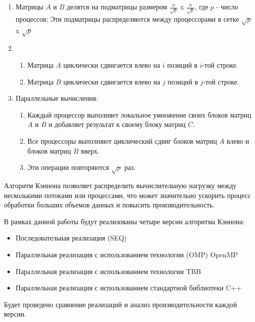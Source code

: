 \documentclass{report}
\begin{document}
\begin{enumerate}
\item Матрицы $A$ и $B$ делятся на подматрицы размером $\frac{n}{\sqrt{p}}$ x $\frac{n}{\sqrt{p}}$, где $p$ - число процессов;
Эти подматрицы распределяются между процессорами в сетке $\sqrt{p}$ x $\sqrt{p}$
\item 
\begin{enumerate}
\item Матрица $A$ циклически сдвигается влево на $i$ позиций в $i$-той строке.
\item Матрица $B$ циклически сдвигается влево на $j$ позиций в $j$-той строке.
\end{enumerate}
\item Параллельные вычисления:
\begin{enumerate}
\item Каждый процессор выполняет локальное умножение своих блоков матриц $A$ и $B$ и добавляет результат к своему блоку матриц $C$.
\item Все процессоры выполняют циклический сдвиг блоков матриц $A$  влево и блоков матриц $B$ вверх.
\item Эти операции повторяются $\sqrt{p}$ раз.
\end{enumerate}
\end{enumerate}

\par Алгоритм Кэннона позволяет распределить вычислительную нагрузку между несколькими потоками или процессами, что может значительно ускорить процесс обработки больших объемов данных и повысить производительность.

\par В рамках данной работы будут реализованы четыре версии алгоритма Кэннона:
\begin{itemize}
\item Последовательная реализация (SEQ)
\item Параллельная реализация с использованием технологии (OMP) OpenMP
\item Параллельная реализация с использованием технологии TBB
\item Параллельная реализация с использованием стандартной библиотеки C++
\end{itemize}
Будет проведено сравнение реализаций и анализ производительности каждой версии.

\newpage

\end{document}
